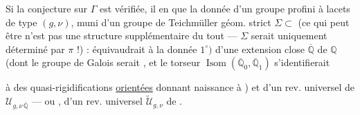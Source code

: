 Si la conjecture sur $\Gamma$ est vérifiée, il en  que la donnée d'un groupe  profini à lacets \inserted{$\pi$} de type $(g,\nu)$, muni d'un groupe de Teichmüller géom. strict $\Sigma\subset$  (ce qui peut être n'est pas une structure supplémentaire du tout --- $\Sigma$ serait uniquement déterminé par $\pi$ !) : équivaudrait à la donnée $1^{\circ})$ d'une extension  close $\overline{\mathbb Q}$ de $\mathbb Q$ (dont le groupe de Galois serait , et le torseur $\operatorname{Isom}(\overline{\mathbb Q}_0,\overline{\mathbb Q}_1)$ s'identifierait


à   des quasi-rigidifications  \uline{orientées} donnant naissance à ) et d'un rev. universel de $\mathcal U_{g,\nu\,\overline{\mathbb Q}}$ --- ou , d'un rev. universel $\widetilde{\mathcal U}_{g,\nu}$ de .


